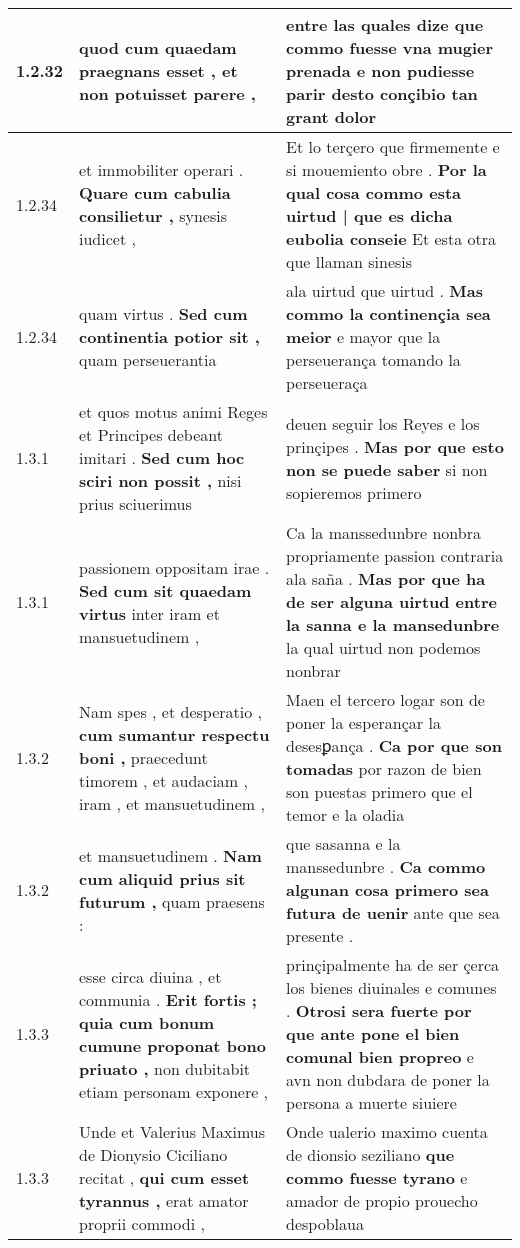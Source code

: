 \begin{tabular}{|p{1cm}|p{6.5cm}|p{6.5cm}|}
1.2.32 & quod \textbf{ cum quaedam praegnans esset , } et non potuisset parere , & entre las quales dize \textbf{ que commo fuesse vna mugier prenada } e non pudiesse parir desto conçibio tan grant dolor \\\hline
1.2.34 & et immobiliter operari . \textbf{ Quare cum cabulia consilietur , } synesis iudicet , & Et lo terçero que firmemente e si mouemiento obre . \textbf{ Por la qual cosa commo esta uirtud | que es dicha eubolia conseie } Et esta otra que llaman sinesis \\\hline
1.2.34 & quam virtus . \textbf{ Sed cum continentia potior sit , } quam perseuerantia & ala uirtud que uirtud . \textbf{ Mas commo la continençia sea meior } e mayor que la perseuerança tomando la perseueraça \\\hline
1.3.1 & et quos motus animi Reges et Principes debeant imitari . \textbf{ Sed cum hoc sciri non possit , } nisi prius sciuerimus & deuen seguir los Reyes e los prinçipes . \textbf{ Mas por que esto non se puede saber } si non sopieremos primero \\\hline
1.3.1 & passionem oppositam irae . \textbf{ Sed cum sit quaedam virtus } inter iram et mansuetudinem , & Ca la manssedunbre nonbra propriamente passion contraria ala saña . \textbf{ Mas por que ha de ser alguna uirtud entre la sanna e la mansedunbre } la qual uirtud non podemos nonbrar \\\hline
1.3.2 & Nam spes , et desperatio , \textbf{ cum sumantur respectu boni , } praecedunt timorem , et audaciam , iram , et mansuetudinem , & Maen el tercero logar son de poner la esperançar la desesꝑança . \textbf{ Ca por que son tomadas } por razon de bien son puestas primero que el temor e la oladia \\\hline
1.3.2 & et mansuetudinem . \textbf{ Nam cum aliquid prius sit futurum , } quam praesens : & que sasanna e la manssedunbre . \textbf{ Ca commo algunan cosa primero sea futura de uenir } ante que sea presente . \\\hline
1.3.3 & esse circa diuina , et communia . \textbf{ Erit fortis ; quia cum bonum cumune proponat bono priuato , } non dubitabit etiam personam exponere , & prinçipalmente ha de ser çerca los bienes diuinales e comunes . \textbf{ Otrosi sera fuerte por que ante pone el bien comunal bien propreo } e avn non dubdara de poner la persona a muerte siuiere \\\hline
1.3.3 & Unde et Valerius Maximus de Dionysio Ciciliano recitat , \textbf{ qui cum esset tyrannus , } erat amator proprii commodi , & Onde ualerio maximo cuenta de dionsio seziliano \textbf{ que commo fuesse tyrano } e amador de propio prouecho despoblaua \\\hline

\end{tabular}
